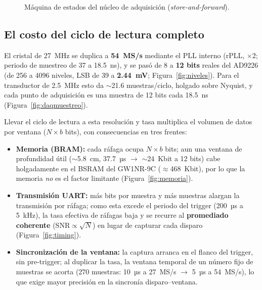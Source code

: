 \documentclass[12pt,letterpaper]{article}
\begin{document}
\begin{figure}[htbp]
\centering
{}
\caption{Máquina de estados del núcleo de adquisición (\textit{store-and-forward}).}
\label{fig:fsm}
\end{figure}

\subsection{El costo del ciclo de lectura completo}
El cristal de 27~MHz se duplica a \textbf{54~MS/s} mediante el PLL interno (rPLL,
$\times2$; periodo de muestreo de 37 a 18.5~ns), y se pasó de 8 a \textbf{12 bits}
reales del AD9226 (de 256 a 4096 niveles, LSB de 39 a \textbf{2.44~mV};
Figura~\ref{fig:niveles}). Para el transductor de 2.5~MHz esto da $\sim$21.6
muestras/ciclo, holgado sobre Nyquist, y cada punto de adquisición es una muestra de
12 bits cada 18.5~ns (Figura~\ref{fig:daqmuestreo}).

Llevar el ciclo de lectura a esta resolución y tasa multiplica el volumen de datos por
ventana ($N\times b$ bits), con consecuencias en tres frentes:
\begin{itemize}
    \item \textbf{Memoria (BRAM):} cada ráfaga ocupa $N\times b$ bits; aun una ventana
    de profundidad útil ($\sim$5.8~cm, 37.7~µs $\to$ $\sim$24~Kbit a 12 bits) cabe
    holgadamente en el BSRAM del GW1NR-9C ($\approx$468~Kbit), por lo que la memoria
    \emph{no} es el factor limitante (Figura~\ref{fig:memoria}).
    \item \textbf{Transmisión UART:} más bits por muestra y más muestras alargan la
    transmisión por ráfaga; como esta excede el periodo del trigger (200~µs a 5~kHz),
    la tasa efectiva de ráfagas baja y se recurre al \textbf{promediado coherente}
    ($\mathrm{SNR}\propto\sqrt{N}$) en lugar de capturar cada disparo
    (Figura~\ref{fig:timing}).
    \item \textbf{Sincronización de la ventana:} la captura arranca en el flanco del
    trigger, sin pre-trigger; al duplicar la tasa, la ventana temporal de un número
    fijo de muestras se acorta (270 muestras: 10~µs a 27~MS/s $\to$ 5~µs a 54~MS/s),
    lo que exige mayor precisión en la sincronía disparo–ventana.
\end{itemize}
\end{document}
